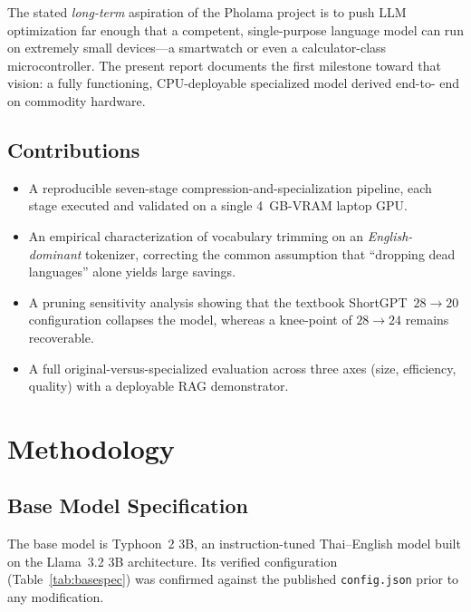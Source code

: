 \documentclass[11pt,a4paper]{article}
\begin{document}
\noindent
The stated \emph{long-term} aspiration of the Pholama project is to push LLM
optimization far enough that a competent, single-purpose language model can
run on extremely small devices---a smartwatch or even a calculator-class
microcontroller. The present report documents the first milestone toward that
vision: a fully functioning, CPU-deployable specialized model derived end-to-%
end on commodity hardware.

\subsection{Contributions}
\begin{itemize}[leftmargin=1.6em]
  \item A reproducible seven-stage compression-and-specialization pipeline,
        each stage executed and validated on a single \SI{4}{GB}-VRAM laptop
        GPU.
  \item An empirical characterization of vocabulary trimming on an
        \emph{English-dominant} tokenizer, correcting the common assumption
        that ``dropping dead languages'' alone yields large savings.
  \item A pruning sensitivity analysis showing that the textbook
        ShortGPT~$28{\to}20$ configuration collapses the model, whereas a
        knee-point of $28{\to}24$ remains recoverable.
  \item A full original-versus-specialized evaluation across three axes
        (size, efficiency, quality) with a deployable RAG demonstrator.
\end{itemize}

\section{Methodology}
\label{sec:method}

\subsection{Base Model Specification}
The base model is Typhoon~2 3B, an instruction-tuned Thai--English model built
on the Llama~3.2 3B architecture. Its verified configuration
(Table~\ref{tab:basespec}) was confirmed against the published
\texttt{config.json} prior to any modification.
\end{document}
